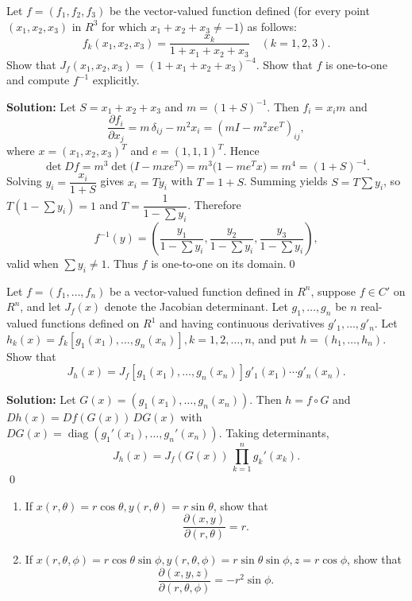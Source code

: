 \begin{problembox}
Let \( f = (f_1, f_2, f_3) \) be the vector-valued function defined (for every point \( (x_1, x_2, x_3) \) in \( R^3 \) for which \( x_1 + x_2 + x_3 \neq -1 \)) as follows:
\[f_k(x_1, x_2, x_3) = \frac{x_k}{1 + x_1 + x_2 + x_3} \quad (k = 1, 2, 3).\]
Show that \( J_f(x_1, x_2, x_3) = (1 + x_1 + x_2 + x_3)^{-4} \). Show that \( f \) is one-to-one and compute \( f^{-1} \) explicitly.
\end{problembox}

\bigskip\noindent\textbf{Solution:}
Let $S=x_1+x_2+x_3$ and $m=(1+S)^{-1}$. Then $f_i=x_im$ and
\[\frac{\partial f_i}{\partial x_j}=m\,\delta_{ij}-m^2 x_i=(mI-m^2xe^{\!T})_{ij},\]
where $x=(x_1,x_2,x_3)^{\!T}$ and $e=(1,1,1)^{\!T}$. Hence
\[\det Df=m^3\det\big(I-mxe^{\!T}\big)=m^3\big(1-me^{\!T}x\big)=m^4=(1+S)^{-4}.
\]
Solving $y_i=\dfrac{x_i}{1+S}$ gives $x_i=Ty_i$ with $T=1+S$. Summing yields $S=T\sum y_i$, so $T(1-\sum y_i)=1$ and $T=\dfrac{1}{1-\sum y_i}$. Therefore
\[f^{-1}(y)=\left(\frac{y_1}{1-\sum y_i},\frac{y_2}{1-\sum y_i},\frac{y_3}{1-\sum y_i}\right),\]
valid when $\sum y_i\neq 1$. Thus $f$ is one-to-one on its domain.\qed


\begin{problembox}
Let \( f = (f_1, \ldots, f_n) \) be a vector-valued function defined in \( R^n \), suppose \( f \in C' \) on \( R^n \), and let \( J_f(x) \) denote the Jacobian determinant. Let \( g_1, \ldots, g_n \) be \( n \) real-valued functions defined on \( R^1 \) and having continuous derivatives \( g'_1, \ldots, g'_n \). Let \( h_k(x) = f_k[g_1(x_1), \ldots, g_n(x_n)], k = 1, 2, \ldots, n \), and put \( h = (h_1, \ldots, h_n) \). Show that
\[J_h(x) = J_f[g_1(x_1), \ldots, g_n(x_n)]g'_1(x_1) \cdots g'_n(x_n).\]
\end{problembox}

\bigskip\noindent\textbf{Solution:}
Let $G(x)=(g_1(x_1),\dots,g_n(x_n))$. Then $h=f\circ G$ and $Dh(x)=Df(G(x))\,DG(x)$ with $DG(x)=\operatorname{diag}(g_1'(x_1),\dots,g_n'(x_n))$. Taking determinants,
\[J_h(x)=J_f(G(x))\,\prod_{k=1}^n g_k'(x_k).
\]\qed


\begin{problembox}
\begin{enumerate}[label=(\alph*)]
    \item If \( x(r, \theta) = r \cos \theta, y(r, \theta) = r \sin \theta \), show that
    \[\frac{\partial (x, y)}{\partial (r, \theta)} = r.\]
    \item If \( x(r, \theta, \phi) = r \cos \theta \sin \phi, y(r, \theta, \phi) = r \sin \theta \sin \phi, z = r \cos \phi \), show that
    \[\frac{\partial (x, y, z)}{\partial (r, \theta, \phi)} = -r^2 \sin \phi.\]
\end{enumerate}
\end{problembox}

